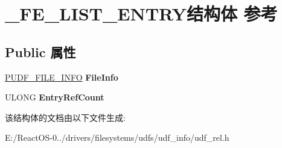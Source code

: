 \hypertarget{struct___f_e___l_i_s_t___e_n_t_r_y}{}\section{\+\_\+\+F\+E\+\_\+\+L\+I\+S\+T\+\_\+\+E\+N\+T\+R\+Y结构体 参考}
\label{struct___f_e___l_i_s_t___e_n_t_r_y}
\subsection*{Public 属性}
\begin{DoxyCompactItemize}
\item 
\mbox{\label{struct___f_e___l_i_s_t___e_n_t_r_y_abff7d53e9932a5a9aa1d2f3d583e1407}} 
\hyperlink{struct___u_d_f___f_i_l_e___i_n_f_o}{P\+U\+D\+F\+\_\+\+F\+I\+L\+E\+\_\+\+I\+N\+FO} {\bfseries File\+Info}
\item 
\mbox{\label{struct___f_e___l_i_s_t___e_n_t_r_y_a942cae831d9ba595df8e3063b358ce0f}} 
U\+L\+O\+NG {\bfseries Entry\+Ref\+Count}
\end{DoxyCompactItemize}


该结构体的文档由以下文件生成\+:\begin{DoxyCompactItemize}
\item 
E\+:/\+React\+O\+S-\/0../drivers/filesystems/udfs/udf\+\_\+info/udf\+\_\+rel.\+h\end{DoxyCompactItemize}
